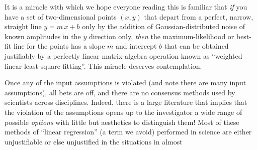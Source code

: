 \documentclass[12pt,twoside]{article}
\begin{document}
It is a miracle with which we hope everyone reading this is familiar
that \emph{if} you have a set of two-dimensional points $(x,y)$ that
depart from a perfect, narrow, straight line $y=m\,x+b$ only by the
addition of Gaussian-distributed noise of known amplitudes in the $y$
direction only, \emph{then} the maximum-likelihood or best-fit line
for the points has a slope $m$ and intercept $b$ that can be obtained
justifiably by a perfectly linear matrix-algebra operation known as
``weighted linear least-square fitting''.  This miracle deserves
contemplation.

Once any of the input assumptions is violated (and note there are many
input assumptions), all bets are off, and there are no consensus
methods used by scientists across disciplines.  Indeed, there is a
large literature that implies that the violation of the assumptions
opens up to the investigator a wide range of possible \emph{options}
with little but aesthetics to distinguish them!  Most of these methods
of ``linear regression'' (a term we avoid) performed in science are
either unjustifiable or else unjustified in the situations in almost
\end{document}
